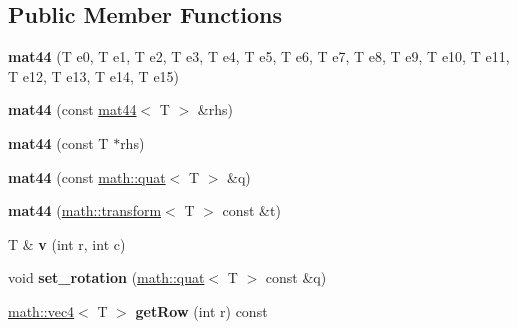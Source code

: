 \subsection*{Public Member Functions}
\begin{DoxyCompactItemize}
\item 
\hypertarget{classmath_1_1mat44_a0d36a6c15c0245d0aafc83b82b2874a1}{
{\bfseries mat44} (T e0, T e1, T e2, T e3, T e4, T e5, T e6, T e7, T e8, T e9, T e10, T e11, T e12, T e13, T e14, T e15)}
\label{classmath_1_1mat44_a0d36a6c15c0245d0aafc83b82b2874a1}

\item 
\hypertarget{classmath_1_1mat44_ada529375ae13a1165b6db99c93568374}{
{\bfseries mat44} (const \hyperlink{classmath_1_1mat44}{mat44}$<$ T $>$ \&rhs)}
\label{classmath_1_1mat44_ada529375ae13a1165b6db99c93568374}

\item 
\hypertarget{classmath_1_1mat44_ad21b555ef817572be46000ece4b87a1a}{
{\bfseries mat44} (const T $\ast$rhs)}
\label{classmath_1_1mat44_ad21b555ef817572be46000ece4b87a1a}

\item 
\hypertarget{classmath_1_1mat44_ad7675a88c81bba453cdc8d123ee4f840}{
{\bfseries mat44} (const \hyperlink{classmath_1_1quat}{math::quat}$<$ T $>$ \&q)}
\label{classmath_1_1mat44_ad7675a88c81bba453cdc8d123ee4f840}

\item 
\hypertarget{classmath_1_1mat44_ae6f87134a89b4bb265bd1059a3577ee8}{
{\bfseries mat44} (\hyperlink{classmath_1_1transform}{math::transform}$<$ T $>$ const \&t)}
\label{classmath_1_1mat44_ae6f87134a89b4bb265bd1059a3577ee8}

\item 
\hypertarget{classmath_1_1mat44_a5375b3aadd48a16d8c6b6f2278f11ede}{
T \& {\bfseries v} (int r, int c)}
\label{classmath_1_1mat44_a5375b3aadd48a16d8c6b6f2278f11ede}

\item 
\hypertarget{classmath_1_1mat44_aa2736fef9d6069a2856ce7c9ff019ff9}{
void {\bfseries set\_\-rotation} (\hyperlink{classmath_1_1quat}{math::quat}$<$ T $>$ const \&q)}
\label{classmath_1_1mat44_aa2736fef9d6069a2856ce7c9ff019ff9}

\item 
\hypertarget{classmath_1_1mat44_a504bde6ba007bbf3d0754dcdac5fcf6d}{
\hyperlink{classmath_1_1vec4}{math::vec4}$<$ T $>$ {\bfseries getRow} (int r) const }
\label{classmath_1_1mat44_a504bde6ba007bbf3d0754dcdac5fcf6d}


\end{DoxyCompactItemize}

